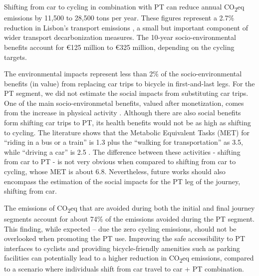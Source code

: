 \documentclass[review, doubleblind, 3p,
authoryear]{elsarticle} %
\begin{document}
Shifting from car to cycling in combination with PT can reduce annual
CO\textsubscript{2}eq emissions by 11,500 to 28,500 tons per year. These
figures represent a 2.7\% reduction in Lisbon's transport emissions
\citep{LisboaENova}, a small but important component of wider transport
decarbonization measures. The 10-year socio-environmental benefits
account for €125 million to €325 million, depending on the cycling
targets.

The environmental impacts represent less than 2\% of the
socio-environmental benefits (in value) from replacing car trips to
bicycle in first-and-last legs. For the PT segment, we did not estimate
the social impacts from substituting car trips. One of the main
socio-environmetal benefits, valued after monetization, comes from the
increase in physical activity \citep{Felix2023ES}. Although there are
also social benefits form shifting car trips to PT, its health benefits
would not be as high as shifting to cycling. The literature shows that
the Metabolic Equivalent Tasks (MET) for ``riding in a bus or a train''
is 1.3 plus the ``walking for transportation'' as 3.5, while ``driving a
car'' is 2.5 \citep{MET2011}. The difference between these activities -
shifting from car to PT - is not very obvious when compared to shifting
from car to cycling, whose MET is about 6.8. Nevertheless, future works
should also encompass the estimation of the social impacts for the PT
leg of the journey, shifting from car.

The emissions of CO\textsubscript{2}eq that are avoided during both the
initial and final journey segments account for about 74\% of the
emissions avoided during the PT segment. This finding, while expected --
due the zero cycling emissions, should not be overlooked when promoting
the PT use. Improving the safe accessibility to PT interfaces to
cyclists and providing bicycle-friendly amenities such as parking
facilities can potentially lead to a higher reduction in
CO\textsubscript{2}eq emissions, compared to a scenario where
individuals shift from car travel to car + PT combination.
\end{document}
